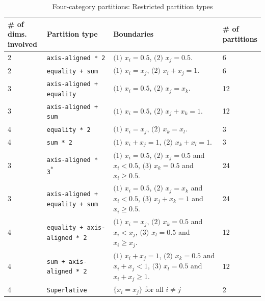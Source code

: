 \begin{table}[H]
\centering
\begin{threeparttable}
\caption{Four-category partitions: Restricted partition types}
\begin{tabularx}{\textwidth}{l l l l}
\toprule
\makecell[l]{\textbf{\# of dims.}\\ \textbf{involved}}
 & \textbf{Partition type} & \textbf{Boundaries} & 
 \makecell[l]{\textbf{\# of}\\\textbf{partitions}} \\
\midrule
2 & \texttt{axis-aligned * 2} & \makecell[l]{$\text{(1) } x_i = 0.5$,\\ $\text{(2) } x_j = 0.5.$} & 6\\
2 & \texttt{equality + sum} & \makecell[l]{$\text{(1) } x_i = x_j$,\\ $\text{(2) } x_i + x_j = 1.$} & 6\\
3 & \texttt{axis-aligned + equality} & \makecell[l]{$\text{(1) } x_i = 0.5$,\\ $\text{(2) } x_j = x_k.$} & 12\\
3 & \texttt{axis-aligned + sum} & \makecell[l]{$\text{(1) } x_i = 0.5$,\\ $\text{(2) } x_j + x_k = 1.$} & 12\\
4 & \texttt{equality * 2} & \makecell[l]{$\text{(1) } x_i = x_j$,\\ $\text{(2) } x_k = x_l.$} & 3\\
4 & \texttt{sum * 2} & \makecell[l]{$\text{(1) } x_i + x_j = 1$, \\ $ \text{(2) } x_k + x_l = 1.$} & 3\\
3 & \texttt{axis-aligned * 3}\textsuperscript{*} & \makecell[l]{$\text{(1) } x_i = 0.5$,\\ $\text{(2) } x_j = 0.5$ and $x_i < 0.5$,\\ $\text{(3) } x_k = 0.5$ and $x_i \geq 0.5.$} & 24\\
3 & \texttt{axis-aligned + equality + sum} & \makecell[l]{$\text{(1) } x_i = 0.5$,\\ $\text{(2) } x_j = x_k$ and $x_i < 0.5$,\\ $\text{(3) } x_j + x_k = 1$ and $x_i \geq 0.5.$} & 24\\
4 & \texttt{equality + axis-aligned * 2} & \makecell[l]{$\text{(1) } x_i = x_j$,\\ $\text{(2) } x_k = 0.5$ and $x_i < x_j$,\\ $\text{(3) } x_l = 0.5$ and $x_i \geq x_j.$} & 12\\
4 & \texttt{sum + axis-aligned * 2} & \makecell[l]{$\text{(1) } x_i + x_j = 1$,\\ $\text{(2) } x_k = 0.5$ and $x_i + x_j < 1$,\\ $\text{(3) } x_l = 0.5$ and $x_i + x_j \geq 1.$} & 12\\
4 & \texttt{Superlative} & $\{x_i = x_j\}$ for all $i \neq j$ & 2\\


\end{tabularx}
\end{threeparttable}
\end{table}
